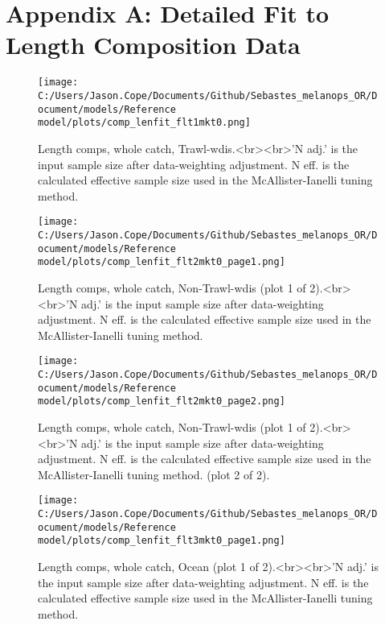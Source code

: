 \documentclass[11pt,
  letterpaper,
]{article}
\begin{document}
\newpage

\clearpage

\hypertarget{app-a}{%
\section{Appendix A: Detailed Fit to Length Composition Data}\label{app-a}}

\begin{figure}
{\centering
\texttt{[image: C:/Users/Jason.Cope/Documents/Github/Sebastes\_melanops\_OR/Document/models/Reference model/plots/comp\_lenfit\_flt1mkt0.png]}
}
\caption{Length comps, whole catch, Trawl-wdis.<br><br>'N adj.' is the input sample size after data-weighting adjustment. N eff. is the calculated effective sample size used in the McAllister-Ianelli tuning method.\label{fig:comp_lenfit_flt1mkt0}}
\end{figure}

\begin{figure}
{\centering
\texttt{[image: C:/Users/Jason.Cope/Documents/Github/Sebastes\_melanops\_OR/Document/models/Reference model/plots/comp\_lenfit\_flt2mkt0\_page1.png]}
}
\caption{Length comps, whole catch, Non-Trawl-wdis (plot 1 of 2).<br><br>'N adj.' is the input sample size after data-weighting adjustment. N eff. is the calculated effective sample size used in the McAllister-Ianelli tuning method.\label{fig:comp_lenfit_flt2mkt0_page1}}
\end{figure}

\begin{figure}
{\centering
\texttt{[image: C:/Users/Jason.Cope/Documents/Github/Sebastes\_melanops\_OR/Document/models/Reference model/plots/comp\_lenfit\_flt2mkt0\_page2.png]}
}
\caption{Length comps, whole catch, Non-Trawl-wdis (plot 1 of 2).<br><br>'N adj.' is the input sample size after data-weighting adjustment. N eff. is the calculated effective sample size used in the McAllister-Ianelli tuning method. (plot 2 of 2).\label{fig:comp_lenfit_flt2mkt0_page2}}
\end{figure}

\begin{figure}
{\centering
\texttt{[image: C:/Users/Jason.Cope/Documents/Github/Sebastes\_melanops\_OR/Document/models/Reference model/plots/comp\_lenfit\_flt3mkt0\_page1.png]}
}
\caption{Length comps, whole catch, Ocean (plot 1 of 2).<br><br>'N adj.' is the input sample size after data-weighting adjustment. N eff. is the calculated effective sample size used in the McAllister-Ianelli tuning method.\label{fig:comp_lenfit_flt3mkt0_page1}}
\end{figure}
\end{document}
